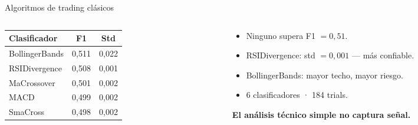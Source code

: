 \documentclass[aspectratio=169, spanish, 12pt]{beamer}
\begin{document}
\begin{frame}{Algoritmos de trading clásicos}
  \begin{columns}[T]
    \begin{column}{0.50\textwidth}
      \begin{tcolorbox}[familybox=coltrading]
        \begin{tabular}{lcc}
          \toprule
          \textbf{Clasificador} & \textbf{F1} & \textbf{Std} \\
          \midrule
          BollingerBands  & 0,511 & 0,022 \\
          RSIDivergence   & 0,508 & 0,001 \\
          MaCrossover     & 0,501 & 0,002 \\
          MACD            & 0,499 & 0,002 \\
          SmaCross        & 0,498 & 0,002 \\
          \bottomrule
        \end{tabular}
      \end{tcolorbox}
    \end{column}
    \begin{column}{0.47\textwidth}
      \begin{itemize}
        \item[\faTimes] Ninguno supera F1 $= 0{,}51$.
        \item[\faCheckCircle] RSIDivergence: std $= 0{,}001$ — más confiable.
        \item[\faExclamationTriangle] BollingerBands: mayor techo, mayor riesgo.
        \item[\faSearch] 6 clasificadores · 184 trials.
      \end{itemize}
      \vspace{0.3em}
      \begin{tcolorbox}[familybox=accent, top=2pt, bottom=2pt]
        \normalsize\textbf{El análisis técnico simple no captura señal.}
      \end{tcolorbox}
    \end{column}
  \end{columns}
\end{frame}
\end{document}
